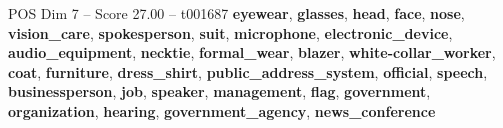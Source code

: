 \begin{textsample}{POS Dim 7 – Score 27.00 – t001687}  \label{ex:f7_pos_025}
\textbf{eyewear}, \textbf{glasses}, \textbf{head}, \textbf{face}, \textbf{nose}, \textbf{vision\_care}, \textbf{spokesperson}, \textbf{suit}, \textbf{microphone}, \textbf{electronic\_device}, \textbf{audio\_equipment}, \textbf{necktie}, \textbf{formal\_wear}, \textbf{blazer}, \textbf{white-collar\_worker}, \textbf{coat}, \textbf{furniture}, \textbf{dress\_shirt}, \textbf{public\_address\_system}, \textbf{official}, \textbf{speech}, \textbf{businessperson}, \textbf{job}, \textbf{speaker}, \textbf{management}, \textbf{flag}, \textbf{government}, \textbf{organization}, \textbf{hearing}, \textbf{government\_agency}, \textbf{news\_conference}

\end{textsample}
